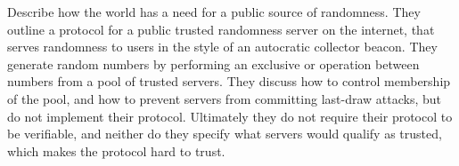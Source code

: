 \item[A Public Randomness Service]
\citet{fischer2011publicrandomnessservice} Describe how the world has a need for a public source of randomness. They outline a protocol for a public trusted randomness server on the internet, that serves randomness to users in the style of an autocratic collector beacon. They generate random numbers by performing an exclusive or operation between numbers from a pool of trusted servers. They discuss how to control membership of the pool, and how to prevent servers from committing last-draw attacks, but do not implement their protocol. Ultimately they do not require their protocol to be verifiable, and neither do they specify what servers would qualify as trusted, which makes the protocol hard to trust. 